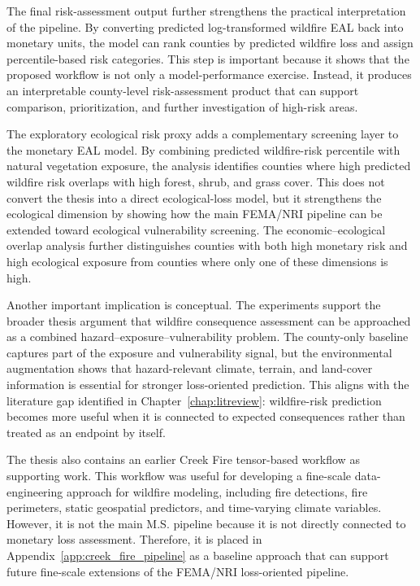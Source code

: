The final risk-assessment output further strengthens the practical interpretation of the pipeline. By converting predicted log-transformed wildfire EAL back into monetary units, the model can rank counties by predicted wildfire loss and assign percentile-based risk categories. This step is important because it shows that the proposed workflow is not only a model-performance exercise. Instead, it produces an interpretable county-level risk-assessment product that can support comparison, prioritization, and further investigation of high-risk areas.

The exploratory ecological risk proxy adds a complementary screening layer to the monetary EAL model. By combining predicted wildfire-risk percentile with natural vegetation exposure, the analysis identifies counties where high predicted wildfire risk overlaps with high forest, shrub, and grass cover. This does not convert the thesis into a direct ecological-loss model, but it strengthens the ecological dimension by showing how the main FEMA/NRI pipeline can be extended toward ecological vulnerability screening. The economic--ecological overlap analysis further distinguishes counties with both high monetary risk and high ecological exposure from counties where only one of these dimensions is high.

Another important implication is conceptual. The experiments support the broader thesis argument that wildfire consequence assessment can be approached as a combined hazard--exposure--vulnerability problem. The county-only baseline captures part of the exposure and vulnerability signal, but the environmental augmentation shows that hazard-relevant climate, terrain, and land-cover information is essential for stronger loss-oriented prediction. This aligns with the literature gap identified in Chapter~\ref{chap:litreview}: wildfire-risk prediction becomes more useful when it is connected to expected consequences rather than treated as an endpoint by itself.

The thesis also contains an earlier Creek Fire tensor-based workflow as supporting work. This workflow was useful for developing a fine-scale data-engineering approach for wildfire modeling, including fire detections, fire perimeters, static geospatial predictors, and time-varying climate variables. However, it is not the main M.S. pipeline because it is not directly connected to monetary loss assessment. Therefore, it is placed in Appendix~\ref{app:creek_fire_pipeline} as a baseline approach that can support future fine-scale extensions of the FEMA/NRI loss-oriented pipeline.

